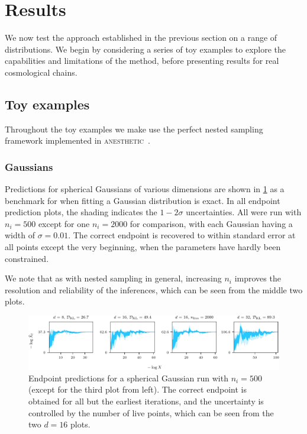 \documentclass[usenatbib]{mnras}
\newcommand{\nlive}{n_i}
\begin{document}
\section{Results}\label{sec:results}
We now test the approach established in the previous section on a range of distributions. We begin by considering a series of toy examples to explore the capabilities and limitations of the method, before presenting results for real cosmological chains.
\subsection{Toy examples}
Throughout the toy examples we make use the perfect nested sampling~\citep{Keeton_2011,2018BayAn..13..873H} framework implemented in \textsc{anesthetic}~\cite{anesthetic}.
\subsubsection{Gaussians}
Predictions for spherical Gaussians of various dimensions are shown in \cref{fig:gauss_predictions} as a benchmark for when fitting a Gaussian distribution is exact. In all endpoint prediction plots, the shading indicates the $1-2\sigma$ uncertainties. All were run with $\nlive = 500$ except for one $\nlive=2000$ for comparison, with each Gaussian having a width of $\sigma = 0.01$. The correct endpoint is recovered to within standard error at all points except the very beginning, when the parameters have hardly been constrained. 
\par
We note that as with nested sampling in general, increasing $\nlive$ improves the resolution and reliability of the inferences, which can be seen from the middle two plots.
\begin{figure}
\begin{center}
    \includegraphics{figures/gauss_predictions.pdf}
\end{center}
\caption{Endpoint predictions for a spherical Gaussian run with $\nlive=500$ (except for the third plot from left). The correct endpoint is obtained for all but the earliest iterations, and the uncertainty is controlled by the number of live points, which can be seen from the two $d = 16$ plots.}
\label{fig:gauss_predictions}
\end{figure}
\end{document}
